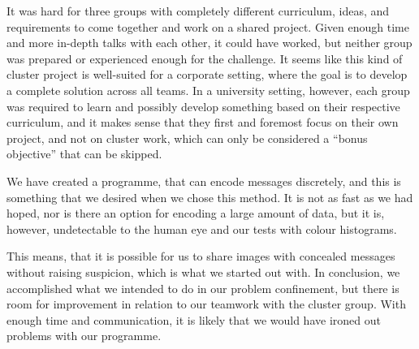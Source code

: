 It was hard for three groups with completely different curriculum, ideas, and requirements to come together and work on a shared project.
Given enough time and more in-depth talks with each other, it could have worked, but neither group was prepared or experienced enough for the challenge.
It seems like this kind of cluster project is well-suited for a corporate setting, where the goal is to develop a complete solution across all teams.
In a university setting, however, each group was required to learn and possibly develop something based on their respective curriculum, and it makes sense that they first and foremost focus on their own project, and not on cluster work, which can only be considered a ``bonus objective'' that can be skipped.

We have created a programme, that can encode messages discretely, and this is something that we desired when we chose this method. 
It is not as fast as we had hoped, nor is there an option for encoding a large amount of data, but it is, however, undetectable to the human eye and our tests with colour histograms.

This means, that it is possible for us to share images with concealed messages without raising suspicion, which is what we started out with. 
In conclusion, we accomplished what we intended to do in our problem confinement, but there is room for improvement in relation to our teamwork with the cluster group.
With enough time and communication, it is likely that we would have ironed out problems with our programme.
